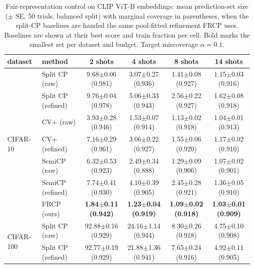\begin{table}[t]
\centering
\small
\setlength{\tabcolsep}{4pt}
\caption{Fair-representation control on CLIP ViT-B embeddings: mean prediction-set size ($\pm$ SE, 50 trials, balanced split) with marginal coverage in parentheses, when the split-CP baselines are handed the same pool-fitted refinement FRCP uses. Baselines are shown at their best score and train fraction per cell. Bold marks the smallest set per dataset and budget. Target miscoverage $\alpha=0.1$.}
\label{tab:refined-baselines-clipb-a01}
\begin{tabular}{llcccc}
\toprule
dataset & method & 2 shots & 4 shots & 8 shots & 14 shots\\
\midrule
\multirow{7}{*}{CIFAR-10} & Split CP (raw) & 9.68$\pm$0.06 {\scriptsize(0.981)} & 3.07$\pm$0.27 {\scriptsize(0.936)} & 1.41$\pm$0.08 {\scriptsize(0.927)} & 1.15$\pm$0.03 {\scriptsize(0.916)}\\
 & Split CP (refined) & 9.76$\pm$0.04 {\scriptsize(0.978)} & 5.06$\pm$0.33 {\scriptsize(0.943)} & 2.56$\pm$0.22 {\scriptsize(0.927)} & 1.62$\pm$0.08 {\scriptsize(0.918)}\\
 & CV+ (raw) & 3.93$\pm$0.28 {\scriptsize(0.946)} & 1.53$\pm$0.07 {\scriptsize(0.914)} & 1.13$\pm$0.02 {\scriptsize(0.918)} & 1.04$\pm$0.01 {\scriptsize(0.913)}\\
 & CV+ (refined) & 7.16$\pm$0.29 {\scriptsize(0.961)} & 3.06$\pm$0.22 {\scriptsize(0.927)} & 1.55$\pm$0.06 {\scriptsize(0.920)} & 1.17$\pm$0.02 {\scriptsize(0.910)}\\
 & SemiCP (raw) & 6.32$\pm$0.53 {\scriptsize(0.923)} & 2.49$\pm$0.34 {\scriptsize(0.888)} & 1.29$\pm$0.09 {\scriptsize(0.906)} & 1.07$\pm$0.02 {\scriptsize(0.901)}\\
 & SemiCP (refined) & 7.74$\pm$0.41 {\scriptsize(0.930)} & 4.10$\pm$0.39 {\scriptsize(0.905)} & 2.45$\pm$0.28 {\scriptsize(0.921)} & 1.36$\pm$0.05 {\scriptsize(0.910)}\\
 & FRCP (ours) & \textbf{1.84$\pm$0.11 {\scriptsize(0.942)}} & \textbf{1.23$\pm$0.04 {\scriptsize(0.919)}} & \textbf{1.09$\pm$0.02 {\scriptsize(0.918)}} & \textbf{1.03$\pm$0.01 {\scriptsize(0.909)}}\\
\midrule
\multirow{7}{*}{CIFAR-100} & Split CP (raw) & 92.88$\pm$0.16 {\scriptsize(0.929)} & 24.16$\pm$1.14 {\scriptsize(0.944)} & 8.30$\pm$0.26 {\scriptsize(0.918)} & 4.75$\pm$0.10 {\scriptsize(0.908)}\\
 & Split CP (refined) & 92.77$\pm$0.19 {\scriptsize(0.929)} & 21.88$\pm$1.36 {\scriptsize(0.941)} & 7.65$\pm$0.24 {\scriptsize(0.916)} & 4.92$\pm$0.11 {\scriptsize(0.905)}\\

\end{tabular}
\end{table}
